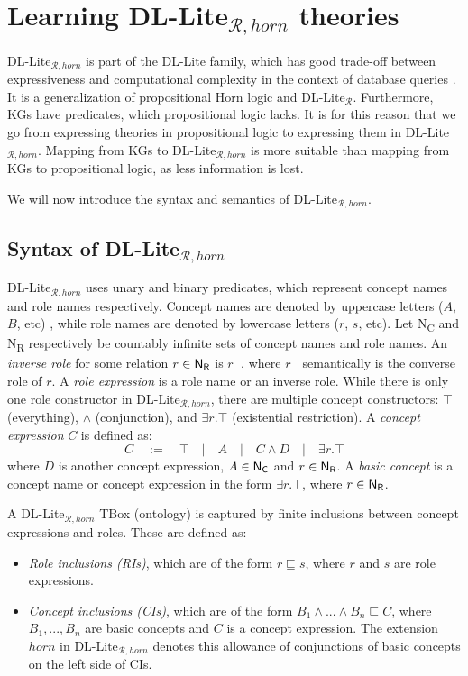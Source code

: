 \chapter{Learning DL-Lite$_{\mathcal{R}, horn}$ theories}

DL-Lite$_{\mathcal{R}, horn}$ is part of the DL-Lite family, which has good trade-off between expressiveness and computational complexity in the context of database queries \cite{borgida2008explanation}. It is a generalization of propositional Horn logic and DL-Lite$_{\mathcal{R}}$. Furthermore, KGs have predicates, which propositional logic lacks. It is for this reason that we go from expressing theories in propositional logic to expressing them in  DL-Lite$_{\mathcal{R}, horn}$. Mapping from KGs to DL-Lite$_{\mathcal{R}, horn}$ is more suitable than mapping from KGs to propositional logic, as less information is lost. 

We will now introduce the syntax and semantics of DL-Lite$_{\mathcal{R}, horn}$.

\section{Syntax of DL-Lite$_{\mathcal{R}, horn}$}
DL-Lite$_{\mathcal{R}, horn}$ uses unary and binary predicates, which represent concept names and role names respectively. Concept names are denoted by uppercase letters ($A$, $B$, etc) , while role names are denoted by lowercase letters ($r$, $s$, etc). Let \textsf{N\textsubscript{C}} and \textsf{N\textsubscript{R}} respectively be countably infinite sets of concept names and role names. An \emph{inverse role} for some relation $r \in \textsf{N\textsubscript{R}}$ is $r^-$, where $r^-$ semantically is the converse role of $r$. A \emph{role expression} is a role name or an inverse role. While there is only one role constructor in DL-Lite$_{\mathcal{R}, horn}$, there are multiple concept constructors: $\top$ (everything), $\wedge$ (conjunction), and $\exists r.\top$ (existential restriction). A \emph{concept expression} $C$ is defined as:
\[C \quad:=\quad \top\quad|\quad A \quad|\quad C\wedge D\quad |\quad \exists r.\top\]
where $D$ is another concept expression, $A\in \textsf{N\textsubscript{C}}$ and $r \in \textsf{N\textsubscript{R}}$. A \emph{basic concept} is a concept name or concept expression in the form $\exists r.\top$, where $r \in \textsf{N\textsubscript{R}}$. 

A DL-Lite$_{\mathcal{R}, horn}$ TBox (ontology) is captured by finite inclusions between concept expressions and roles. These are defined as: 
\begin{itemize}
    \setlength\itemsep{1em}
    \item \emph{Role inclusions (RIs)}, which are of the form $r\sqsubseteq s$, where $r$ and $s$ are role expressions.
    \item \emph{Concept inclusions (CIs)}, which are of the form $B_1 \wedge ... \wedge B_n \sqsubseteq C$, where $B_1, ..., B_n$ are basic concepts and $C$ is a concept expression. The extension $horn$ in DL-Lite$_{\mathcal{R}, horn}$ denotes this allowance of conjunctions of basic concepts on the left side of CIs.
\end{itemize}

